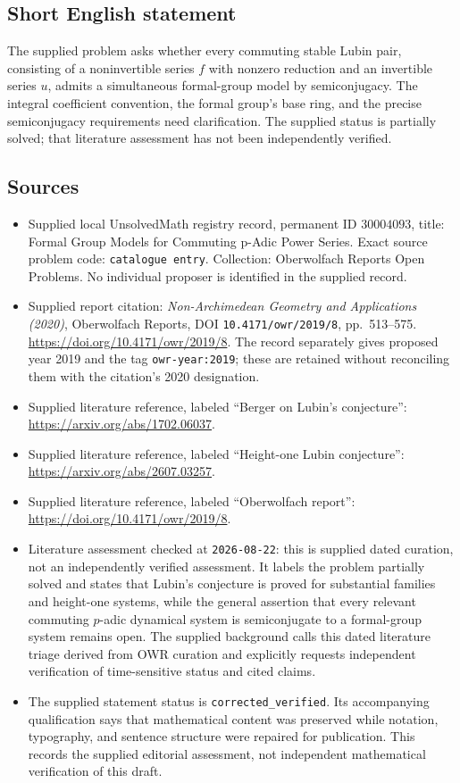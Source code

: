 \documentclass[11pt]{article}
\begin{document}
\subsection{Short English statement}
The supplied problem asks whether every commuting stable Lubin pair, consisting of a noninvertible series \(f\) with nonzero reduction and an invertible series \(u\), admits a simultaneous formal-group model by semiconjugacy. The integral coefficient convention, the formal group's base ring, and the precise semiconjugacy requirements need clarification. The supplied status is partially solved; that literature assessment has not been independently verified.
\subsection{Sources}
\begin{itemize}
\item Supplied local UnsolvedMath registry record, permanent ID \(30004093\), title: Formal Group Models for Commuting p-Adic Power Series. Exact source problem code: \texttt{catalogue entry}. Collection: Oberwolfach Reports Open Problems. No individual proposer is identified in the supplied record.
\item Supplied report citation: \emph{Non-Archimedean Geometry and Applications (2020)}, Oberwolfach Reports, DOI \texttt{10.4171/owr/2019/8}, pp.\ 513--575. \url{https://doi.org/10.4171/owr/2019/8}. The record separately gives proposed year 2019 and the tag \texttt{owr-year:2019}; these are retained without reconciling them with the citation's 2020 designation.
\item Supplied literature reference, labeled ``Berger on Lubin's conjecture'': \url{https://arxiv.org/abs/1702.06037}.
\item Supplied literature reference, labeled ``Height-one Lubin conjecture'': \url{https://arxiv.org/abs/2607.03257}.
\item Supplied literature reference, labeled ``Oberwolfach report'': \url{https://doi.org/10.4171/owr/2019/8}.
\item Literature assessment checked at \texttt{2026-08-22}: this is supplied dated curation, not an independently verified assessment. It labels the problem partially solved and states that Lubin's conjecture is proved for substantial families and height-one systems, while the general assertion that every relevant commuting \(p\)-adic dynamical system is semiconjugate to a formal-group system remains open. The supplied background calls this dated literature triage derived from OWR curation and explicitly requests independent verification of time-sensitive status and cited claims.
\item The supplied statement status is \texttt{corrected\_verified}. Its accompanying qualification says that mathematical content was preserved while notation, typography, and sentence structure were repaired for publication. This records the supplied editorial assessment, not independent mathematical verification of this draft.
\end{itemize}
\end{document}
